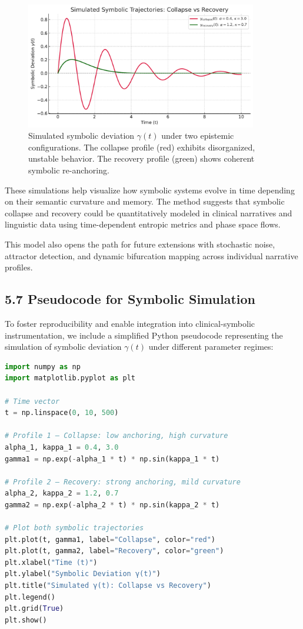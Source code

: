 \begin{figure}
  \centering
  \includegraphics[width=0.9\textwidth]{figs/simulated_gamma_trajectories.pdf}
  \caption{Simulated symbolic deviation $\gamma(t)$ under two epistemic configurations. The collapse profile (red) exhibits disorganized, unstable behavior. The recovery profile (green) shows coherent symbolic re-anchoring.}
  \label{fig:gamma_simulation}
\end{figure}

These simulations help visualize how symbolic systems evolve in time depending on their semantic curvature and memory. The method suggests that symbolic collapse and recovery could be quantitatively modeled in clinical narratives and linguistic data using time-dependent entropic metrics and phase space flows.

This model also opens the path for future extensions with stochastic noise, attractor detection, and dynamic bifurcation mapping across individual narrative profiles.


\subsection*{5.7 Pseudocode for Symbolic Simulation}

To foster reproducibility and enable integration into clinical-symbolic instrumentation, we include a simplified Python pseudocode representing the simulation of symbolic deviation $\gamma(t)$ under different parameter regimes:

\begin{lstlisting}[language=Python, caption={Simulation of $\gamma(t)$ for symbolic collapse and recovery}, label={lst:gamma_simulation}]
import numpy as np
import matplotlib.pyplot as plt

# Time vector
t = np.linspace(0, 10, 500)

# Profile 1 — Collapse: low anchoring, high curvature
alpha_1, kappa_1 = 0.4, 3.0
gamma1 = np.exp(-alpha_1 * t) * np.sin(kappa_1 * t)

# Profile 2 — Recovery: strong anchoring, mild curvature
alpha_2, kappa_2 = 1.2, 0.7
gamma2 = np.exp(-alpha_2 * t) * np.sin(kappa_2 * t)

# Plot both symbolic trajectories
plt.plot(t, gamma1, label="Collapse", color="red")
plt.plot(t, gamma2, label="Recovery", color="green")
plt.xlabel("Time (t)")
plt.ylabel("Symbolic Deviation γ(t)")
plt.title("Simulated γ(t): Collapse vs Recovery")
plt.legend()
plt.grid(True)
plt.show()
\end{lstlisting}


